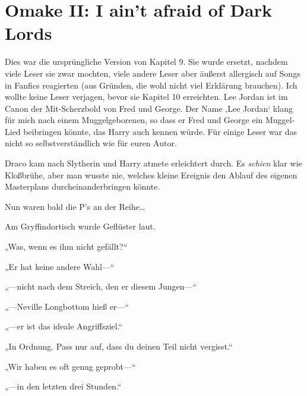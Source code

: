 


\section{Omake II: I ain’t afraid of Dark Lords}

Dies war die ursprüngliche Version von Kapitel 9. Sie wurde ersetzt, nachdem viele Leser sie zwar mochten, viele andere Leser aber äußerst allergisch auf Songs in Fanfics reagierten (aus Gründen, die wohl nicht viel Erklärung brauchen). Ich wollte keine Leser verjagen, bevor sie Kapitel 10 erreichten. Lee Jordan ist im Canon der Mit-Scherzbold von Fred und George. Der Name ‚Lee Jordan‘ klang für mich nach einem Muggelgeborenen, so dass er Fred und George ein Muggel-Lied beibringen könnte, das Harry auch kennen würde. Für einige Leser war das nicht so selbstverständlich wie für euren Autor.

\later

Draco kam nach Slytherin und Harry atmete erleichtert durch. Es \emph{schien} klar wie Kloßbrühe, aber man wusste nie, welches kleine Ereignis den Ablauf des eigenen Masterplans durcheinanderbringen könnte.

Nun waren bald die P’s an der Reihe…

Am Gryffindortisch wurde Geflüster laut.
\begin{em}
„Was, wenn es ihm nicht gefällt?“

„Er hat keine andere Wahl—“

„—nicht nach dem Streich, den er diesem Jungen—“

„—Neville Longbottom hieß er—“

„—er ist das ideale Angriffsziel.“

„In Ordnung. Pass nur auf, dass du deinen Teil nicht vergisst.“

„Wir haben es oft genug geprobt—“

„—in den letzten drei Stunden.“
\end{em}

